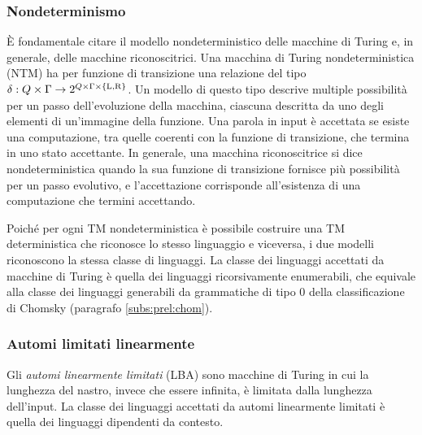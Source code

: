 \subsubsection{Nondeterminismo}
È fondamentale citare il modello nondeterministico delle macchine di Turing e, in generale, delle macchine riconoscitrici. Una macchina di Turing nondeterministica (NTM) ha per funzione di transizione una relazione del tipo $\delta:Q\times\Gamma\to 2^{Q\times\Gamma\times\left\{ \mathrm L,\mathrm R \right\}}$. Un modello di questo tipo descrive multiple possibilità per un passo dell'evoluzione della macchina, ciascuna descritta da uno degli elementi di un'immagine della funzione. Una parola in input è accettata se esiste una computazione, tra quelle coerenti con la funzione di transizione, che termina in uno stato accettante.
In generale, una macchina riconoscitrice si dice nondeterministica quando la sua funzione di transizione fornisce più possibilità per un passo evolutivo, e l'accettazione corrisponde all'esistenza di una computazione che termini accettando.

Poiché per ogni TM nondeterministica è possibile costruire una TM deterministica che riconosce lo stesso linguaggio e viceversa, i due modelli riconoscono la stessa classe di linguaggi. La classe dei linguaggi accettati da macchine di Turing è quella dei linguaggi ricorsivamente enumerabili, che equivale alla classe dei linguaggi generabili da grammatiche di tipo 0 della classificazione di Chomsky (paragrafo \ref{subs:prel:chom}).

\subsubsection{Automi limitati linearmente}
Gli \emph{automi linearmente limitati} (LBA) sono macchine di Turing in cui la lunghezza del nastro, invece che essere infinita, è limitata dalla lunghezza dell'input. La classe dei linguaggi accettati da automi linearmente limitati è quella dei linguaggi dipendenti da contesto.


